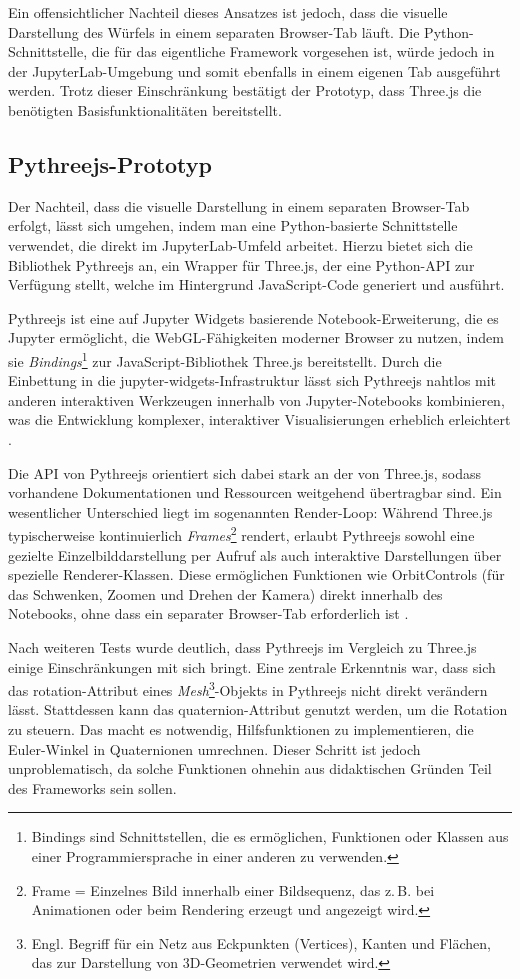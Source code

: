 Ein offensichtlicher Nachteil dieses Ansatzes ist jedoch, dass die visuelle Darstellung des Würfels in einem separaten Browser-Tab läuft.
Die Python-Schnittstelle, die für das eigentliche Framework vorgesehen ist, würde jedoch in der JupyterLab-Umgebung und somit ebenfalls in einem eigenen Tab ausgeführt werden.
Trotz dieser Einschränkung bestätigt der Prototyp, dass Three.js die benötigten Basisfunktionalitäten bereitstellt.

\subsection{Pythreejs-Prototyp}
Der Nachteil, dass die visuelle Darstellung in einem separaten Browser-Tab erfolgt,
lässt sich umgehen, indem man eine Python-basierte Schnittstelle verwendet, die direkt im JupyterLab-Umfeld arbeitet.
Hierzu bietet sich die Bibliothek Pythreejs an, ein Wrapper für Three.js, der eine Python-API zur Verfügung stellt,
welche im Hintergrund JavaScript-Code generiert und ausführt.

Pythreejs ist eine auf Jupyter Widgets basierende Notebook-Erweiterung,
die es Jupyter ermöglicht, die WebGL-Fähigkeiten moderner Browser zu nutzen, indem sie \textit{Bindings}\footnote{Bindings sind Schnittstellen, die es ermöglichen,
Funktionen oder Klassen aus einer Programmiersprache in einer anderen zu verwenden.} zur JavaScript-Bibliothek Three.js bereitstellt.
Durch die Einbettung in die jupyter-widgets-Infrastruktur lässt sich Pythreejs nahtlos mit anderen interaktiven Werkzeugen innerhalb von Jupyter-Notebooks kombinieren,
was die Entwicklung komplexer, interaktiver Visualisierungen erheblich erleichtert .

Die API von Pythreejs orientiert sich dabei stark an der von Three.js,
sodass vorhandene Dokumentationen und Ressourcen weitgehend übertragbar sind.
Ein wesentlicher Unterschied liegt im sogenannten Render-Loop: Während Three.js typischerweise kontinuierlich \textit{Frames}\footnote{Frame = Einzelnes Bild innerhalb einer Bildsequenz, das z.\,B. bei Animationen oder beim Rendering erzeugt und angezeigt wird.} rendert,
erlaubt Pythreejs sowohl eine gezielte Einzelbilddarstellung per Aufruf als auch interaktive Darstellungen über spezielle Renderer-Klassen.
Diese ermöglichen Funktionen wie OrbitControls (für das Schwenken, Zoomen und Drehen der Kamera) direkt innerhalb des Notebooks,
ohne dass ein separater Browser-Tab erforderlich ist .

Nach weiteren Tests wurde deutlich, dass Pythreejs im Vergleich zu Three.js einige Einschränkungen mit sich bringt.
Eine zentrale Erkenntnis war, dass sich das rotation-Attribut eines \textit{Mesh}\footnote{Engl. Begriff für ein Netz aus Eckpunkten (Vertices), Kanten und Flächen, das zur Darstellung von 3D-Geometrien verwendet wird.}-Objekts in Pythreejs nicht direkt verändern lässt.
Stattdessen kann das quaternion-Attribut genutzt werden, um die Rotation zu steuern. Das macht es notwendig, Hilfsfunktionen zu implementieren,
die Euler-Winkel in Quaternionen umrechnen. Dieser Schritt ist jedoch unproblematisch, da solche Funktionen ohnehin aus didaktischen Gründen Teil des Frameworks sein sollen.


